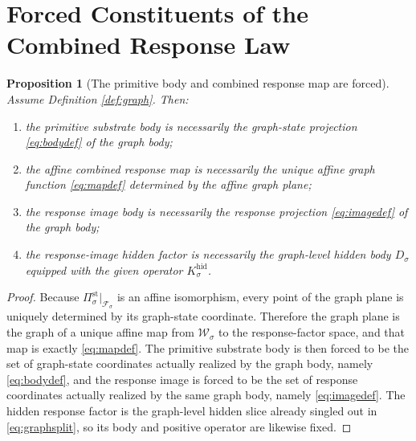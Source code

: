 \documentclass[11pt]{article}
\newcommand{\GapBody}[1]{D_{#1}}
\newcommand{\HiddenOperator}[1]{K_{#1}^{\mathrm{hid}}}
\newcommand{\GraphState}[1]{\mathcal W_{#1}}
\newcommand{\GraphAffine}[1]{\mathcal F_{#1}}
\newcommand{\StateProj}[1]{\Pi_{#1}^{\mathrm{st}}}
\newtheorem{proposition}{Proposition}
\begin{document}
\section{Forced Constituents of the Combined Response Law}

\begin{proposition}[The primitive body and combined response map are forced]
\label{prop:forced}
Assume Definition \ref{def:graph}. Then:
\begin{enumerate}
    \item the primitive substrate body is necessarily the graph-state projection \eqref{eq:bodydef} of the graph body;
    \item the affine combined response map is necessarily the unique affine graph function \eqref{eq:mapdef} determined by the affine graph plane;
    \item the response image body is necessarily the response projection \eqref{eq:imagedef} of the graph body;
    \item the response-image hidden factor is necessarily the graph-level hidden body \(\GapBody{\sigma}\) equipped with the given operator \(\HiddenOperator{\sigma}\).
\end{enumerate}
\end{proposition}

\begin{proof}
Because \(\StateProj{\sigma}\big|_{\GraphAffine{\sigma}}\) is an affine isomorphism, every point of the graph plane is uniquely determined by its graph-state coordinate. Therefore the graph plane is the graph of a unique affine map from \(\GraphState{\sigma}\) to the response-factor space, and that map is exactly \eqref{eq:mapdef}. The primitive substrate body is then forced to be the set of graph-state coordinates actually realized by the graph body, namely \eqref{eq:bodydef}, and the response image is forced to be the set of response coordinates actually realized by the same graph body, namely \eqref{eq:imagedef}. The hidden response factor is the graph-level hidden slice already singled out in \eqref{eq:graphsplit}, so its body and positive operator are likewise fixed.
\end{proof}
\end{document}
